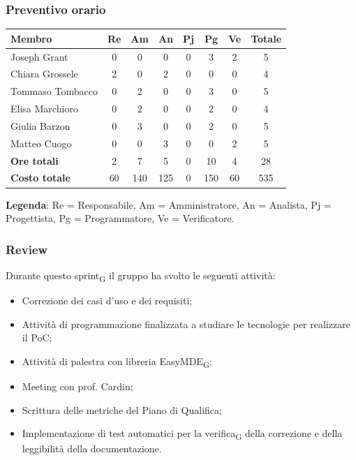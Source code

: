 \documentclass[11pt,a4paper]{article}
\newcommand{\gls}[1]{#1\textsubscript{G}}
\begin{document}
\subsubsection{Preventivo orario}
\begin{center}
    \begin{tabular}{|l|c|c|c|c|c|c|c|}
        \hline
        \textbf{Membro} & \textbf{Re} & \textbf{Am} & \textbf{An} & \textbf{Pj} & \textbf{Pg} & \textbf{Ve} & \textbf{Totale} \\
        \hline
        Joseph Grant & 0 & 0 & 0 & 0 & 3 & 2 & 5 \\
        \hline
        Chiara Grossele & 2 & 0 & 2 & 0 & 0 & 0 & 4 \\
        \hline
        Tommaso Tombacco & 0 & 2 & 0 & 0 & 3 & 0 & 5 \\
        \hline
        Elisa Marchioro & 0 & 2 & 0 & 0 & 2 & 0 & 4 \\
        \hline
        Giulia Barzon & 0 & 3 & 0 & 0 & 2 & 0 & 5 \\
        \hline
        Matteo Cuogo & 0 & 0 & 3 & 0 & 0 & 2 & 5 \\
        \hline
        \textbf{Ore totali} & 2 & 7 & 5 & 0 & 10 & 4 & 28 \\
        \hline
        \textbf{Costo totale} & 60 & 140 & 125 & 0 & 150 & 60 & 535 \\
        \hline
    \end{tabular}
\end{center}

\noindent \textbf{Legenda}: Re = Responsabile, Am = Amministratore, An = Analista, Pj = Progettista, Pg = Programmatore, Ve = Verificatore.

\subsubsection{Review}
Durante questo \gls{sprint} il gruppo ha svolto le seguenti attività:

\begin{itemize}
        \item Correzione dei casi d'uso e dei requisiti;
        \item Attività di programmazione finalizzata a studiare le tecnologie per realizzare il PoC;
        \item Attività di palestra con libreria \gls{EasyMDE};
        \item Meeting con prof. Cardin;
        \item Scrittura delle metriche del Piano di Qualifica;
        \item Implementazione di test automatici per la \gls{verifica} della correzione e della leggibilità della documentazione.
    \end{itemize}
\end{document}
